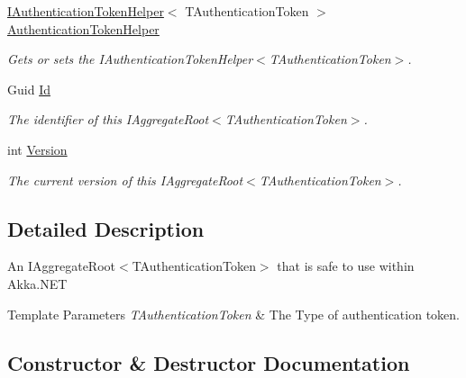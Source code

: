 \begin{DoxyCompactItemize}
\hyperlink{interfaceCqrs_1_1Authentication_1_1IAuthenticationTokenHelper}{I\+Authentication\+Token\+Helper}$<$ T\+Authentication\+Token $>$ \hyperlink{classCqrs_1_1Akka_1_1Domain_1_1AkkaAggregateRoot_a3a73139fe47221bd579949e978d0126d_a3a73139fe47221bd579949e978d0126d}{Authentication\+Token\+Helper}
\begin{DoxyCompactList}\small\item\em Gets or sets the I\+Authentication\+Token\+Helper$<$\+T\+Authentication\+Token$>$. \end{DoxyCompactList}\item 
Guid \hyperlink{classCqrs_1_1Akka_1_1Domain_1_1AkkaAggregateRoot_ac03d79efc02629b17642c6324ff181c9_ac03d79efc02629b17642c6324ff181c9}{Id}
\begin{DoxyCompactList}\small\item\em The identifier of this I\+Aggregate\+Root$<$\+T\+Authentication\+Token$>$. \end{DoxyCompactList}\item 
int \hyperlink{classCqrs_1_1Akka_1_1Domain_1_1AkkaAggregateRoot_a4b526322c63542b1da2a700ff1b48d0c_a4b526322c63542b1da2a700ff1b48d0c}{Version}
\begin{DoxyCompactList}\small\item\em The current version of this I\+Aggregate\+Root$<$\+T\+Authentication\+Token$>$. \end{DoxyCompactList}\end{DoxyCompactItemize}


\subsection{Detailed Description}
An I\+Aggregate\+Root$<$\+T\+Authentication\+Token$>$ that is safe to use within Akka.\+N\+ET 


\begin{DoxyTemplParams}{Template Parameters}
{\em T\+Authentication\+Token} & The Type of authentication token.\\
\hline
\end{DoxyTemplParams}


\subsection{Constructor \& Destructor Documentation}
\mbox{\label{classCqrs_1_1Akka_1_1Domain_1_1AkkaAggregateRoot_a060f981e4c3023aec36e7c6f1cfb3a9d_a060f981e4c3023aec36e7c6f1cfb3a9d}} 

